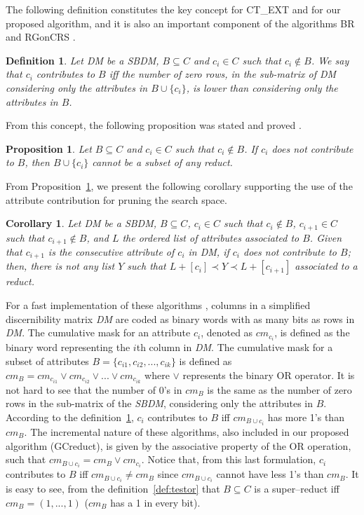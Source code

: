 \documentclass[number,preprint,review,12pt]{elsarticle}
\newtheorem{proposition}{Proposition}
\newtheorem{definition}{Definition}
\newtheorem{corollary}{Corollary}
\begin{document}
	The following definition constitutes the key concept for CT\_EXT \citep{Sanchez07} and for our proposed algorithm, and it is also an important component of the algorithms BR \citep{Lias09} and RGonCRS \citep{WangP07}.
			
	\begin{definition}\label{def:contrib}
		Let DM be a SBDM, $B \subseteq C$ and  $c_i \in C$ such that $c_i \notin B$. We say that $c_i$ contributes to $B$ iff the	number of zero rows, in the sub-matrix of DM considering only the attributes in $B\cup\{c_i\}$, is lower than considering only the attributes in $B$.
	\end{definition}
			
	From this concept, the following proposition was stated and proved \cite{Sanchez07}.
			
	\begin{proposition}\label{prop:contrib} 
		Let $B \subseteq C$ and  $c_i \in C$ such that $c_i \notin B$. If $c_i$ does not contribute to $B$, then $B\cup\{c_i\}$ cannot be a subset of any reduct.
	\end{proposition}
	
	From Proposition~\ref{prop:contrib}, we present the following corollary supporting the use of the attribute contribution for pruning the search space.
	
	\begin{corollary}\label{coro:contrib} 
		Let DM be a SBDM, $B \subseteq C$,  $c_i \in C$ such that $c_i \notin B$, $c_{i+1} \in C$ such that $c_{i+1} \notin B$, and $L$ the ordered list of attributes associated to $B$. Given that $c_{i+1}$ is the consecutive attribute of $c_i$ in DM, if $c_i$ does not contribute to $B$; then, there is not any list $Y$ such that $L+[c_i] \prec Y \prec L+[c_{i+1}]$ associated to a reduct.
	\end{corollary}
	
	For a fast implementation of these algorithms \citep{Sanchez10,Lias13}, columns in a simplified discernibility matrix \textit{DM} are coded as binary words with as many bits as rows in \textit{DM}. The cumulative mask for an attribute $c_i$, denoted as $cm_{c_i}$, is defined as the binary word representing the $i$th column in \textit{DM}. The cumulative mask for a subset of attributes $B=\lbrace c_{i1},c_{i2},...,c_{ik} \rbrace$ is defined	as $cm_B = cm_{c_{i1}} \vee cm_{c_{i2}} \vee ... \vee cm_{c_{ik}}$ where $\vee$ represents the binary OR operator. It is not hard to see that the number of 0's in $cm_B$ is the same as the number of zero rows in the sub-matrix of the \textit{SBDM}, considering only the attributes in $B$. According to the definition~\ref{def:contrib}, $c_i$ contributes to $B$ iff $cm_{B\cup c_i}$ has more 1's than $cm_B$. The incremental nature of these algorithms, also included in  our proposed algorithm (GCreduct), is given by the associative property of the OR operation, such that  $cm_{B\cup c_i}=cm_B\vee cm_{c_i}$. Notice that, from this last formulation, $c_i$ contributes to $B$ iff $cm_{B\cup c_i}\neq cm_B$ since $cm_{B\cup c_i}$ cannot have less 1's than $cm_B$. It is easy to see, from the definition~\ref{def:testor} that $B \subseteq C$ is a super--reduct iff $cm_B=(1,...,1)$ ($cm_B$ has a 1 in every bit).
	
\end{document}
